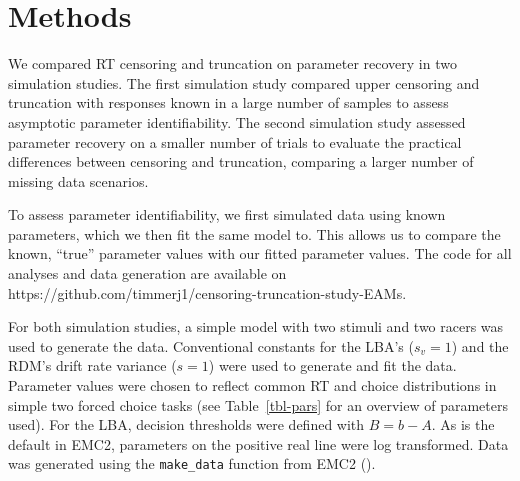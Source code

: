 \documentclass[
  stu,
  floatsintext,
  longtable,
  nolmodern,
  notxfonts,
  notimes,
  draftfirst,
  colorlinks=true,linkcolor=blue,citecolor=blue,urlcolor=blue]{apa7}
\begin{document}
\section{Methods}\label{methods}

We compared RT censoring and truncation on parameter recovery in two
simulation studies. The first simulation study compared upper censoring
and truncation with responses known in a large number of samples to
assess asymptotic parameter identifiability. The second simulation study
assessed parameter recovery on a smaller number of trials to evaluate
the practical differences between censoring and truncation, comparing a
larger number of missing data scenarios.

To assess parameter identifiability, we first simulated data using known
parameters, which we then fit the same model to. This allows us to
compare the known, ``true'' parameter values with our fitted parameter
values. The code for all analyses and data generation are available on
https://github.com/timmerj1/censoring-truncation-study-EAMs.

For both simulation studies, a simple model with two stimuli and two
racers was used to generate the data. Conventional constants for the
LBA's (\(s_v = 1\)) and the RDM's drift rate variance (\(s = 1\)) were
used to generate and fit the data. Parameter values were chosen to
reflect common RT and choice distributions in simple two forced choice
tasks (see Table~\ref{tbl-pars} for an overview of parameters used). For
the LBA, decision thresholds were defined with \(B = b - A\). As is the
default in EMC2, parameters on the positive real line were log
transformed. Data was generated using the \texttt{make\_data} function
from EMC2 ().
\end{document}
